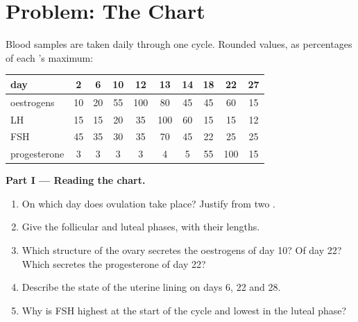 \section{Problem: The Chart}

\begin{problem}
\label{pb:g11:hormones-and-reproduction:1}
Blood samples are taken daily through one cycle. Rounded values, as
percentages of each 's maximum:

\begin{center}
\begin{tabular}{lccccccccc}
day & 2 & 6 & 10 & 12 & 13 & 14 & 18 & 22 & 27 \\ \hline
oestrogens & 10 & 20 & 55 & 100 & 80 & 45 & 45 & 60 & 15 \\
LH & 15 & 15 & 20 & 35 & 100 & 60 & 15 & 15 & 12 \\
FSH & 45 & 35 & 30 & 35 & 70 & 45 & 22 & 25 & 25 \\
progesterone & 3 & 3 & 3 & 3 & 4 & 5 & 55 & 100 & 15 \\
\end{tabular}
\end{center}

\medskip
\noindent\textbf{Part I --- Reading the chart.}
\begin{enumerate}
  \item On which day does ovulation take place? Justify from two
        .
  \item Give the follicular and luteal phases, with their lengths.
  \item Which structure of the ovary secretes the oestrogens of day
        10? Of day 22? Which secretes the progesterone of day 22?
  \item Describe the state of the uterine lining on days 6, 22 and 28.
  \item Why is FSH highest at the start of the cycle and lowest in
        the luteal phase?
\end{enumerate}


\end{problem}
